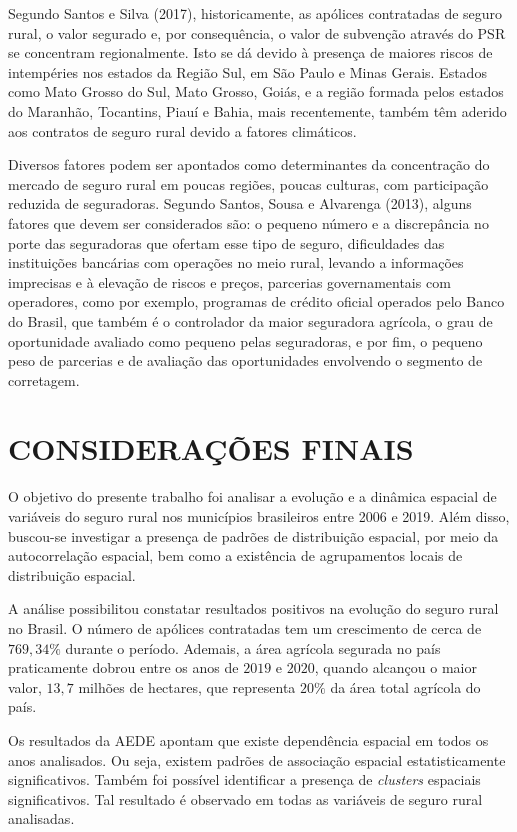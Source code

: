 Segundo Santos e Silva (2017), historicamente, as apólices contratadas de seguro rural, o valor segurado e, por consequência, o valor de subvenção através do PSR se concentram regionalmente. Isto se dá devido à presença de maiores riscos de intempéries nos estados da Região Sul, em São Paulo e Minas Gerais. Estados como Mato Grosso do Sul, Mato Grosso, Goiás, e a região formada pelos estados do Maranhão, Tocantins, Piauí e Bahia, mais recentemente, também têm aderido aos contratos de seguro rural devido a fatores climáticos. 

Diversos fatores podem ser apontados como determinantes da concentração do mercado de seguro rural em poucas regiões, poucas culturas, com participação reduzida de seguradoras. Segundo Santos, Sousa e Alvarenga (2013), alguns fatores que devem ser considerados são: o pequeno número e a discrepância no porte das seguradoras que ofertam esse tipo de seguro, dificuldades das instituições bancárias com operações no meio rural, levando a informações imprecisas e à elevação de riscos e preços, parcerias governamentais com operadores, como por exemplo, programas de crédito oficial operados pelo Banco do Brasil, que também é o controlador da maior seguradora agrícola,  o grau de oportunidade avaliado como pequeno pelas seguradoras, e por fim, o pequeno peso de parcerias e de avaliação das oportunidades envolvendo o segmento de corretagem.   

\section{CONSIDERAÇÕES FINAIS}

O objetivo do presente trabalho foi analisar a evolução e a dinâmica espacial de variáveis do seguro rural nos municípios brasileiros entre 2006 e 2019. Além disso, buscou-se investigar a presença de padrões de distribuição espacial, por meio da autocorrelação espacial, bem como a existência de agrupamentos locais de distribuição espacial.

A análise possibilitou constatar resultados positivos na evolução do seguro rural no Brasil. O número de apólices contratadas tem um crescimento de cerca de $769,34\%$ durante o período. Ademais, a área agrícola segurada no país praticamente dobrou entre os anos de $2019$ e $2020$, quando alcançou o maior valor, $13,7$ milhões de hectares, que representa $20\%$ da área total agrícola do país. 

Os resultados da AEDE apontam que existe dependência espacial em todos os anos analisados. Ou seja, existem padrões de associação espacial estatisticamente significativos. Também foi possível identificar a presença de \textit{clusters} espaciais significativos. Tal resultado é observado em todas as variáveis de seguro rural analisadas. 

